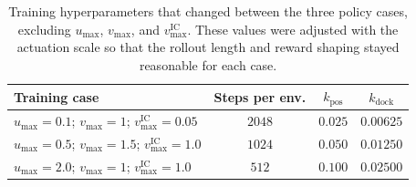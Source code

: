\begin{table}[H]
\centering
\footnotesize
\caption{Training hyperparameters that changed between the three policy cases, excluding $u_{\max}$, $v_{\max}$, and $v_{\max}^{\mathrm{IC}}$. These values were adjusted with the actuation scale so that the rollout length and reward shaping stayed reasonable for each case.}
\label{tab:training-hyperparameters-case-specific}
\begin{tabular}{@{}p{}ccc@{}}
\toprule
\textbf{Training case} & \textbf{Steps per env.} & \textbf{$k_{\mathrm{pos}}$} & \textbf{$k_{\mathrm{dock}}$} \\
\midrule
$u_{\max}=0.1$; $v_{\max}=1$; $v_{\max}^{\mathrm{IC}}=0.05$ & $2048$ & $0.025$ & $0.00625$ \\
$u_{\max}=0.5$; $v_{\max}=1.5$; $v_{\max}^{\mathrm{IC}}=1.0$ & $1024$ & $0.050$ & $0.01250$ \\
$u_{\max}=2.0$; $v_{\max}=1$; $v_{\max}^{\mathrm{IC}}=1.0$ & $512$ & $0.100$ & $0.02500$ \\
\bottomrule
\end{tabular}
\end{table}

